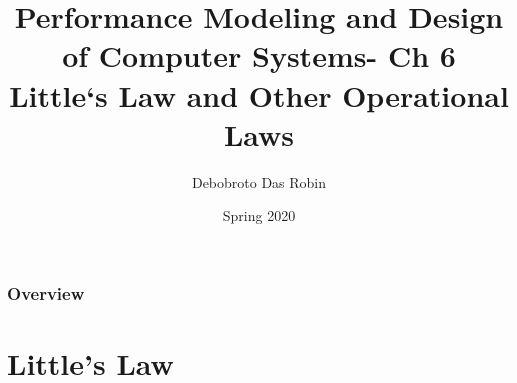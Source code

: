 \documentclass{beamer}
\title{Performance Modeling and
Design of Computer Systems- Ch 6 \\
Little`s Law and Other
Operational Laws
}
\author{Debobroto Das Robin} %
\institute{Kent State University}
\date{Spring 2020}
\begin{document}
\begin{frame}
        \titlepage
        \begin{center}
    \href{mailto:drobin@kent.edu}{}
        \end{center}
\end{frame}

\begin{frame}
\frametitle{Overview} %
\tableofcontents %
\end{frame}



\section{Little’s Law}
\end{document}
